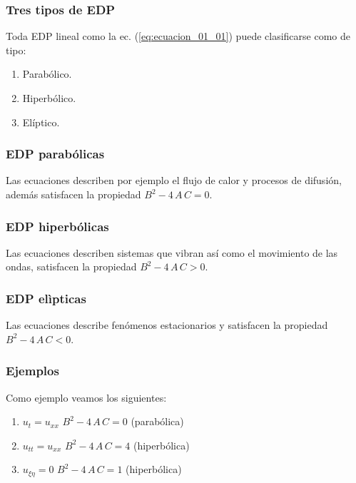 \documentclass[12pt]{beamer}
\begin{document}
\begin{frame}
\frametitle{Tres tipos de EDP}
Toda EDP lineal como la ec. (\ref{eq:ecuacion_01_01}) puede clasificarse como de tipo:
\begin{enumerate}[<+->]
\item Parabólico.
\item Hiperbólico.
\item Elíptico.
\end{enumerate}
\end{frame}
\begin{frame}
\frametitle{EDP parabólicas}
Las ecuaciones  describen por ejemplo el flujo de calor y procesos de difusión, \pause además satisfacen la propiedad $B^{2} - 4 \, A \, C = 0$.
\end{frame}
\begin{frame}
\frametitle{EDP hiperbólicas}
Las ecuaciones  describen sistemas que vibran así como el movimiento de las ondas, \pause satisfacen la propiedad $B^{2} - 4 \, A \, C > 0$.
\end{frame}
\begin{frame}
\frametitle{EDP elìpticas}
Las ecuaciones  describe fenómenos estacionarios \pause y satisfacen la propiedad $B^{2} - 4 \, A \, C < 0$.
\end{frame}
\begin{frame}
\frametitle{Ejemplos}
Como ejemplo veamos los siguientes:
\pause
{}
\begin{enumerate}[<+->]
\setlength\itemsep{1em}
\item $u_{t} = u_{xx}$ \hspace{1cm} $B^{2} - 4 \, A \, C = 0$ \hspace{1cm} (parabólica)
\item $u_{tt} = u_{xx}$ \hspace{0.8cm} $B^{2} - 4 \, A \, C = 4$ \hspace{1cm} (hiperbólica)
\item $u_{\xi \eta} = 0$ \hspace{1cm} $B^{2} - 4 \, A \, C = 1$ \hspace{1cm} (hiperbólica)
\seti
\end{enumerate}
\end{frame}
\end{document}
